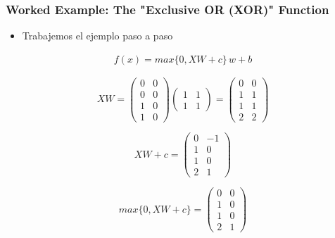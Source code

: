 \documentclass[
  shownotes,
  xcolor={svgnames},
  hyperref={colorlinks,citecolor=DarkBlue,linkcolor=DarkRed,urlcolor=DarkBlue}
  , aspectratio=169]{beamer}
\begin{document}
\begin{frame}
\frametitle{Worked Example: The "Exclusive OR (XOR)" Function}

\begin{itemize}
\item Trabajemos el ejemplo paso a paso
\end{itemize}
\begin{align}
f(x)=max\{0,XW+c\}\,w+b
\end{align}

\[
XW=\left(\begin{array}{cc}
0 & 0\\
0 & 0\\
1 & 0\\
1 & 0
\end{array}\right)\left(\begin{array}{cc}
1 & 1\\
1 & 1
\end{array}\right)=\left(\begin{array}{cc}
0 & 0\\
1 & 1\\
1 & 1\\
2 & 2
\end{array}\right)
\]

\[
XW+c=\left(\begin{array}{cc}
0 & -1\\
1 & 0\\
1 & 0\\
2 & 1
\end{array}\right)
\]

\[
max\{0,XW+c\}=\left(\begin{array}{cc}
0 & 0\\
1 & 0\\
1 & 0\\
2 & 1
\end{array}\right)
\]

\end{frame}
\end{document}
